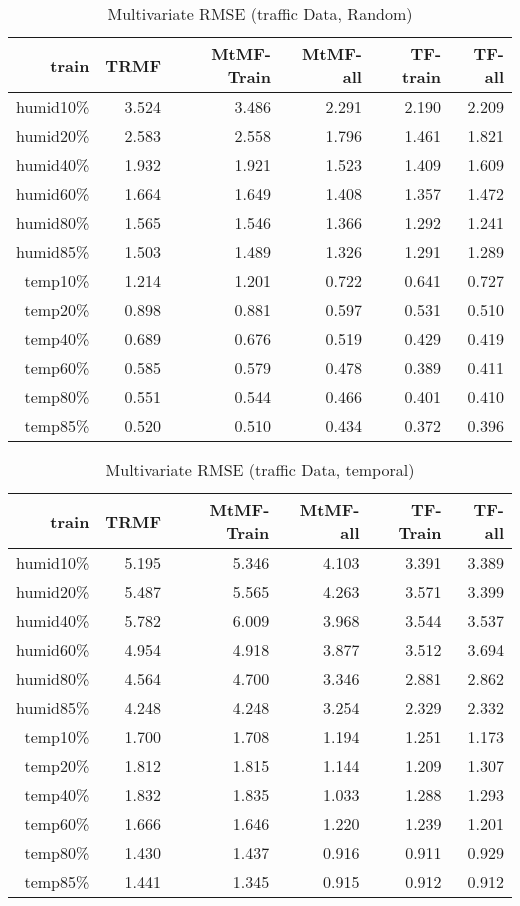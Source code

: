 \begin{table}[htbp]
\setlength{\tabcolsep}{2pt}
\centering
\caption{Multivariate RMSE (traffic Data, Random)}
\label{table_multi_traffic_random}
\begin{tabular}{r | r r r r r}
train	&TRMF	&MtMF-Train	&MtMF-all &TF-train & TF-all\\ \hline
humid10\%	&3.524 	&3.486 	&2.291&2.190&2.209\\  
humid20\%	&2.583 	&2.558 	&1.796&1.461&1.821\\
humid40\%	&1.932 	&1.921 	&1.523&1.409&1.609\\
humid60\%	&1.664 	&1.649 	&1.408&1.357&1.472\\
humid80\%	&1.565 	&1.546 	&1.366&1.292&1.241\\
humid85\%	&1.503 	&1.489 	&1.326&1.291&1.289\\ \hline
 temp10\%	&1.214 	&1.201 	&0.722&0.641&0.727\\
 temp20\%	&0.898 	&0.881 	&0.597&0.531&0.510\\
 temp40\%	&0.689 	&0.676 	&0.519&0.429&0.419\\
 temp60\%	&0.585 	&0.579 	&0.478&0.389&0.411\\
 temp80\%	&0.551 	&0.544 	&0.466&0.401&0.410\\
 temp85\%	&0.520 	&0.510 	&0.434&0.372&0.396\\
\end{tabular}
\end{table}

\begin{table}[htbp]
\setlength{\tabcolsep}{2pt}
\centering
\caption{Multivariate RMSE (traffic Data, temporal)}
\label{table_multi_traffic_temporal}
\begin{tabular}{r | r r r r r}
train	&TRMF	&MtMF-Train	&MtMF-all &TF-Train &TF-all\\ \hline
humid10\%	&5.195 	&5.346 	&4.103&3.391&3.389\\  
humid20\%	&5.487 	&5.565 	&4.263&3.571&3.399\\
humid40\%	&5.782 	&6.009 	&3.968&3.544&3.537\\
humid60\%	&4.954 	&4.918 	&3.877&3.512&3.694\\
humid80\%	&4.564 	&4.700 	&3.346&2.881&2.862\\
humid85\%	&4.248 	&4.248 	&3.254&2.329&2.332\\ \hline
 temp10\%	&1.700 	&1.708 	&1.194&1.251&1.173\\
 temp20\%	&1.812 	&1.815 	&1.144&1.209&1.307\\
 temp40\%	&1.832 	&1.835 	&1.033&1.288&1.293\\
 temp60\%	&1.666 	&1.646 	&1.220&1.239&1.201\\
 temp80\%	&1.430 	&1.437 	&0.916&0.911&0.929\\
 temp85\%	&1.441 	&1.345 	&0.915&0.912&0.912\\
\end{tabular}
\end{table}
